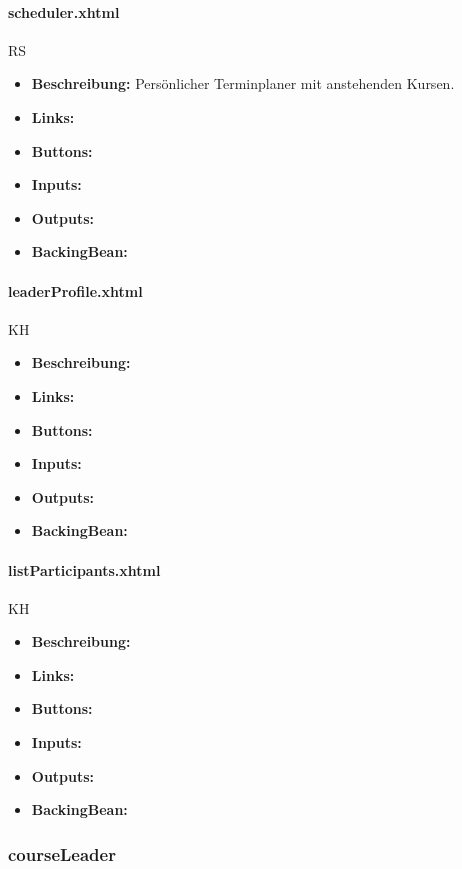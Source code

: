 				\paragraph{scheduler.xhtml}
					RS\\
					\begin{itemize}
						\item \textbf{Beschreibung:} Persönlicher Terminplaner mit anstehenden Kursen.
						\item \textbf{Links:}
						\item \textbf{Buttons:}
						\item \textbf{Inputs:}
						\item \textbf{Outputs:}
						\item \textbf{BackingBean:}
					\end{itemize}
				
				\paragraph{leaderProfile.xhtml}
					KH\\
					\begin{itemize}
						\item \textbf{Beschreibung:}
						\item \textbf{Links:}
						\item \textbf{Buttons:}
						\item \textbf{Inputs:}
						\item \textbf{Outputs:}
						\item \textbf{BackingBean:}
					\end{itemize}
				
				\paragraph{listParticipants.xhtml}
					KH\\
					\begin{itemize}
						\item \textbf{Beschreibung:}
						\item \textbf{Links:}
						\item \textbf{Buttons:}
						\item \textbf{Inputs:}
						\item \textbf{Outputs:}
						\item \textbf{BackingBean:}
					\end{itemize}
			
			\subsubsection{courseLeader}
			
